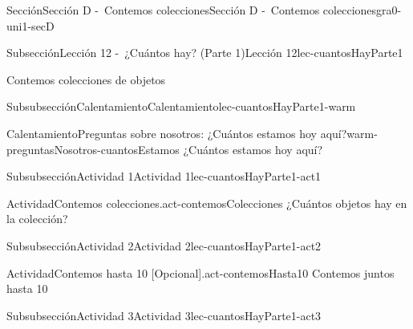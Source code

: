 \documentclass[twoside,10pt,]{article}
\begin{document}
\begin{sectionptx}{Sección}{Sección D -~Contemos colecciones}{}{Sección D -~Contemos colecciones}{}{}{gra0-uni1-secD}
%
%
\typeout{************************************************}
\typeout{************************************************}
%
\begin{subsectionptx}{Subsección}{Lección 12 -~¿Cuántos hay? (Parte 1)}{}{Lección 12}{}{}{lec-cuantosHayParte1}
\begin{introduction}{}%
Contemos colecciones de objetos%
\end{introduction}%
%
%
\typeout{************************************************}
\typeout{************************************************}
%
\begin{subsubsectionptx}{Subsubsección}{Calentamiento}{}{Calentamiento}{}{}{lec-cuantosHayParte1-warm}
\begin{exploration}{Calentamiento}{Preguntas sobre nosotros: ¿Cuántos estamos hoy aquí?}{warm-preguntasNosotros-cuantosEstamos}%
¿Cuántos estamos hoy aquí?%
\end{exploration}%
\end{subsubsectionptx}
%
%
\typeout{************************************************}
\typeout{************************************************}
%
\begin{subsubsectionptx}{Subsubsección}{Actividad 1}{}{Actividad 1}{}{}{lec-cuantosHayParte1-act1}
\begin{activity}{Actividad}{Contemos colecciones.}{act-contemosColecciones}%
¿Cuántos objetos hay en la colección?%
\end{activity}%
\end{subsubsectionptx}
%
%
\typeout{************************************************}
\typeout{************************************************}
%
\begin{subsubsectionptx}{Subsubsección}{Actividad 2}{}{Actividad 2}{}{}{lec-cuantosHayParte1-act2}
\begin{activity}{Actividad}{Contemos hasta 10 [Opcional].}{act-contemosHasta10}%
Contemos juntos hasta 10%
\end{activity}%
\end{subsubsectionptx}
%
%
\typeout{************************************************}
\typeout{************************************************}
%
\begin{subsubsectionptx}{Subsubsección}{Actividad 3}{}{Actividad 3}{}{}{lec-cuantosHayParte1-act3}

\end{subsubsectionptx}
\end{subsectionptx}
\end{sectionptx}
\end{document}
